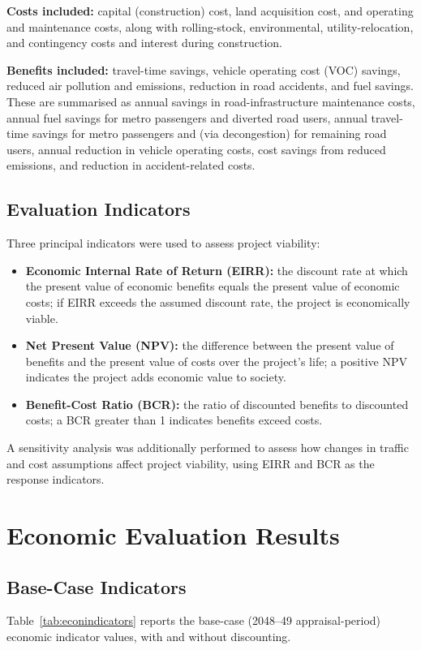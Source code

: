 \documentclass[11pt]{article}
\begin{document}
\textbf{Costs included:} capital (construction) cost, land acquisition cost, and operating and
maintenance costs, along with rolling-stock, environmental, utility-relocation, and contingency costs
and interest during construction.

\textbf{Benefits included:} travel-time savings, vehicle operating cost (VOC) savings, reduced air
pollution and emissions, reduction in road accidents, and fuel savings. These are summarised as annual
savings in road-infrastructure maintenance costs, annual fuel savings for metro passengers and diverted road
users, annual travel-time savings for metro passengers and (via decongestion) for remaining road users,
annual reduction in vehicle operating costs, cost savings from reduced emissions, and reduction in
accident-related costs.

\subsection{Evaluation Indicators}
Three principal indicators were used to assess project viability:
\begin{itemize}
  \item \textbf{Economic Internal Rate of Return (EIRR):} the discount rate at which the present
  value of economic benefits equals the present value of economic costs; if EIRR exceeds the assumed
  discount rate, the project is economically viable.
  \item \textbf{Net Present Value (NPV):} the difference between the present value of benefits and
  the present value of costs over the project's life; a positive NPV indicates the project adds
  economic value to society.
  \item \textbf{Benefit-Cost Ratio (BCR):} the ratio of discounted benefits to discounted costs; a
  BCR greater than 1 indicates benefits exceed costs.
\end{itemize}

A sensitivity analysis was additionally performed to assess how changes in traffic and cost assumptions
affect project viability, using EIRR and BCR as the response indicators.

\section{Economic Evaluation Results}

\subsection{Base-Case Indicators}
Table~\ref{tab:econindicators} reports the base-case (2048--49 appraisal-period) economic indicator
values, with and without discounting.
\end{document}
